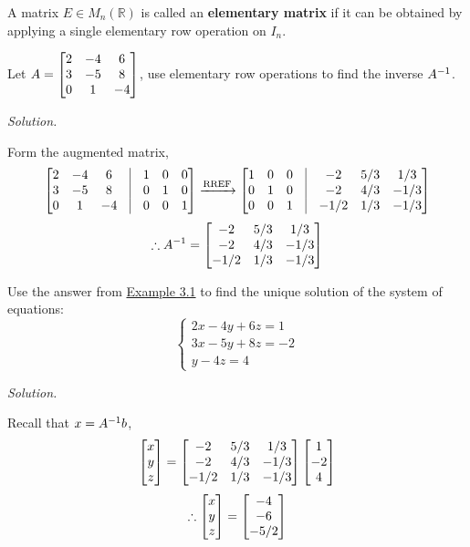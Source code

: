 \begin{definition}
A matrix $E \in M_n(\mathbb{R})$ is called an \textbf{elementary matrix} if it can be obtained by applying a single elementary row operation on $I_n$.
\end{definition}

\newpage
\begin{example}\label{example:3.1}
Let $A = \begin{bmatrix} 2 & -4 & 6 \\ 3 & -5 & 8 \\ 0 & 1 & -4 \end{bmatrix}$, use elementary row operations to find the inverse $A^{-1}$.
\end{example}

\textit{Solution.} 

Form the augmented matrix,
$$\bmat{2 & -4 & 6 & \vline & 1 & 0 & 0 \\
3 & -5 & 8 & \vline & 0 & 1 & 0 \\ 0 & 1 & -4 & \vline & 0 & 0 & 1} \xrightarrow{\text{RREF}} 
\bmat{1 & 0 & 0 & \vline & -2 & 5/3 & 1/3 \\ 0 & 1 & 0 & \vline & -2 & 4/3 & -1/3 \\ 0 & 0 & 1 & \vline & -1/2 & 1/3 & -1/3}
$$
$$\therefore A^{-1} = \begin{bmatrix} -2 & 5/3 & 1/3 \\ -2 & 4/3 & -1/3 \\ -1/2 & 1/3 & -1/3 \end{bmatrix}$$

\begin{example}
Use the answer from \hyperref[example:3.1]{Example 3.1} to find the unique solution of the system of equations:
$$\begin{cases}
    2x - 4y + 6z = 1 \\
    3x - 5y + 8z = -2 \\
    y - 4z = 4
\end{cases}$$

\textit{Solution.}

Recall that $x = A^{-1} b$,
$$\begin{bmatrix} x \\ y \\ z \end{bmatrix} = \begin{bmatrix} -2 & 5/3 & 1/3 \\ -2 & 4/3 & -1/3 \\ -1/2 & 1/3 & -1/3 \end{bmatrix}\begin{bmatrix} 1 \\ -2 \\ 4 \end{bmatrix}$$
$$\therefore \begin{bmatrix} x \\ y \\ z  \end{bmatrix} = \begin{bmatrix} -4 \\ -6 \\ -5/2 \end{bmatrix}$$
\end{example}

